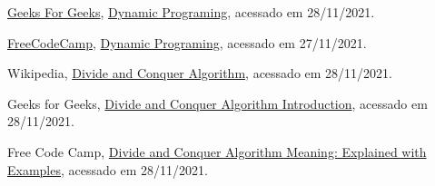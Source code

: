\begin{thebibliography}{10}
  \href{https://www.geeksforgeeks.org/}{Geeks For Geeks},
  \href{https://www.geeksforgeeks.org/dynamic-programming/}{Dynamic Programing},
  acessado em 28/11/2021.
  
  \href{https://www.freecodecamp.org}{FreeCodeCamp},
  \href{https://youtu.be/oBt53YbR9Kk?t=210}{Dynamic Programing},
  acessado em 27/11/2021.

  Wikipedia,
  \href{https://en.wikipedia.org/wiki/Divide-and-conquer_algorithm}{Divide and Conquer Algorithm},
  acessado em 28/11/2021.

  Geeks for Geeks,
  \href{https://www.geeksforgeeks.org/divide-and-conquer-algorithm-introduction/}{Divide and Conquer Algorithm Introduction},
  acessado em 28/11/2021.

  Free Code Camp,
  \href{https://www.freecodecamp.org/news/divide-and-conquer-algorithms/}{Divide and Conquer Algorithm Meaning: Explained with Examples},
  acessado em 28/11/2021.

\end{thebibliography}